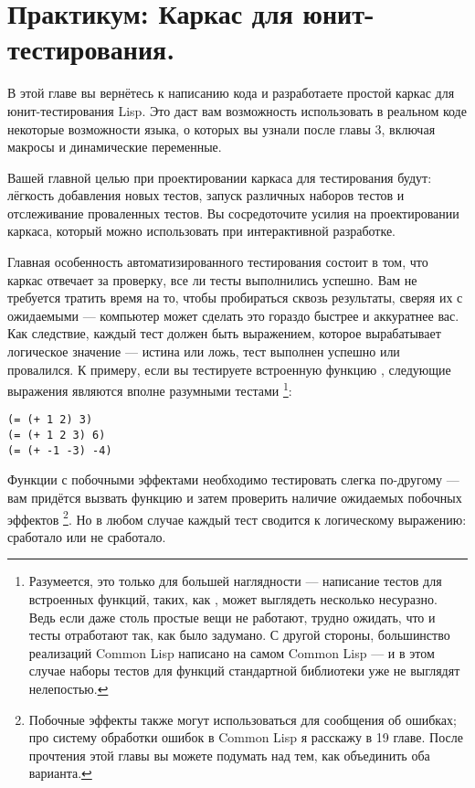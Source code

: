 \chapter{Практикум: Каркас для юнит-тестирования.}
\label{ch:09}

В этой главе вы вернётесь к написанию кода и разработаете простой каркас для
юнит-тестирования Lisp. Это даст вам возможность использовать в реальном коде некоторые
возможности языка, о которых вы узнали после главы 3, включая макросы и динамические
переменные.

Вашей главной целью при проектировании каркаса для тестирования будут: лёгкость добавления
новых тестов, запуск различных наборов тестов и отслеживание проваленных тестов. Вы
сосредоточите усилия на проектировании каркаса, который можно использовать при
интерактивной разработке.

Главная особенность автоматизированного тестирования состоит в том, что каркас отвечает за
проверку, все ли тесты выполнились успешно. Вам не требуется тратить время на то, чтобы
пробираться сквозь результаты, сверяя их с ожидаемыми --- компьютер может сделать это
гораздо быстрее и аккуратнее вас. Как следствие, каждый тест должен быть выражением,
которое вырабатывает логическое значение --- истина или ложь, тест выполнен успешно или
провалился. К примеру, если вы тестируете встроенную функцию \code{+}, следующие выражения
являются вполне разумными тестами \footnote{Разумеется, это только для большей наглядности
  --- написание тестов для встроенных функций, таких, как \code{+}, может выглядеть
  несколько несуразно. Ведь если даже столь простые вещи не работают, трудно ожидать, что
  и тесты отработают так, как было задумано. С другой стороны, большинство реализаций
  Common Lisp написано на самом Common Lisp --- и в этом случае наборы тестов для функций
  стандартной библиотеки уже не выглядят нелепостью.}:

\begin{lstlisting}
(= (+ 1 2) 3)
(= (+ 1 2 3) 6)
(= (+ -1 -3) -4)
\end{lstlisting}

Функции с побочными эффектами необходимо тестировать слегка по-другому --- вам придётся
вызвать функцию и затем проверить наличие ожидаемых побочных эффектов \footnote{Побочные
  эффекты также могут использоваться для сообщения об ошибках; про систему обработки
  ошибок в Common Lisp я расскажу в 19 главе.  После прочтения этой главы вы можете
  подумать над тем, как объединить оба варианта.}. Но в любом случае каждый тест сводится
к логическому выражению: сработало или не сработало.

